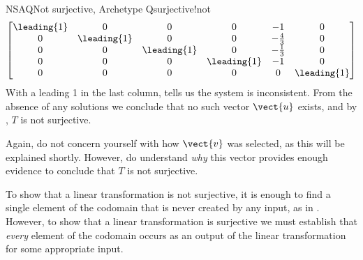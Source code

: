 \begin{example}{NSAQ}{Not surjective, Archetype Q}{surjective!not}
\begin{equation*}
\begin{bmatrix}
\leading{1} & 0 & 0 & 0 & -1 & 0\\
0 & \leading{1} & 0 & 0 & -\frac{4}{3} & 0\\
0 & 0 & \leading{1} & 0 & -\frac{1}{3} & 0\\
0 & 0 & 0 & \leading{1} & -1 & 0\\
0 & 0 & 0 & 0 & 0 & \leading{1}\\
\end{bmatrix}
\end{equation*}
%
With a leading 1 in the last column,  tells us the system is inconsistent.  From the absence of any solutions we conclude that no such vector $\vect{u}$ exists, and by , $T$ is not surjective.\par
%
Again, do not concern yourself with how $\vect{v}$ was selected, as this will be explained shortly.  However, do understand {\em why} this vector provides enough evidence to conclude that $T$ is not surjective.
%
\end{example}
%
To show that a linear transformation is not surjective, it is enough to find a single element of the codomain that is never created by any input, as in .  However, to show that a linear transformation is surjective we must establish that {\em every} element of the codomain occurs as an output of the linear transformation for some appropriate input.
%
